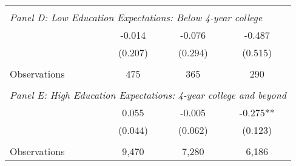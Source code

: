 {\begin{tabular}{lccc}
&  &  &   \\
\multicolumn{4}{l}{\textit{Panel D: Low Education Expectations: Below 4-year college}} \\
\hspace{3mm}        &      -0.014   &      -0.076   &      -0.487   \\
                    &     (0.207)   &     (0.294)   &     (0.515)   \\
                    &               &               &               \\
\hspace{3mm}Observations&         475   &         365   &         290   \\
 
&  &  &   \\
\multicolumn{4}{l}{\textit{Panel E: High Education Expectations: 4-year college and beyond}} \\
\hspace{3mm}        &       0.055   &      -0.005   &      -0.275** \\
                    &     (0.044)   &     (0.062)   &     (0.123)   \\
                    &               &               &               \\
\hspace{3mm}Observations&       9,470   &       7,280   &       6,186   \\
 

\bottomrule
\end{tabular}
}
